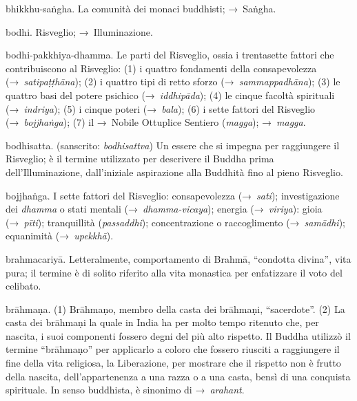 \begin{glossarydescription}
\item[bhikkhu-saṅgha.] La comunità dei monaci buddhisti; →~Saṅgha.

\item[bodhi.] Risveglio; →~Illuminazione.

\item[bodhi-pakkhiya-dhamma.] Le parti del Risveglio, ossia i trentasette
  fattori che contribuiscono al Risveglio: (1) i quattro fondamenti della
  consapevolezza (→~\emph{satipaṭṭhāna}); (2) i quattro tipi di retto sforzo
  (→~\emph{sammappadhāna}); (3) le quattro basi del potere psichico
  (→~\emph{iddhipāda}); (4) le cinque facoltà spirituali (→~\emph{indriya}); (5)
  i cinque poteri (→~\emph{bala}); (6) i sette fattori del Risveglio
  (→~\emph{bojjhaṅga}); (7) il →~Nobile Ottuplice Sentiero (\emph{magga});
  →~\emph{magga}.

\item[bodhisatta.] (sanscrito: \emph{bodhisattva}) Un essere che si impegna per
  raggiungere il Risveglio; è il termine utilizzato per descrivere il Buddha
  prima dell'Illuminazione, dall'iniziale aspirazione alla Buddhità fino al
  pieno Risveglio.

\item[bojjhaṅga.]\label{glossary-bojjhanga} I sette fattori del Risveglio: consapevolezza
  (→~\emph{sati}); investigazione dei \emph{dhamma} o stati mentali
  (→~\emph{dhamma-vicaya}); energia (→~\emph{viriya}): gioia (→~\emph{pīti});
  tranquillità (\emph{passaddhi}); concentrazione o raccoglimento
  (→~\emph{samādhi}); equanimità (→~\emph{upekkhā}).

\item[brahmacariyā.] Letteralmente, comportamento di Brahmā, ``condotta
  divina'', vita pura; il termine è di solito riferito alla vita monastica per
  enfatizzare il voto del celibato.

\item[brāhmaṇa.]\label{glossary-brahmana} (1) Brāhmaṇo, membro della casta dei brāhmaṇi,
  ``sacerdote''. (2) La casta dei brāhmaṇi la quale in India ha per molto tempo
  ritenuto che, per nascita, i suoi componenti fossero degni del più alto
  rispetto. Il Buddha utilizzò il termine ``brāhmaṇo'' per applicarlo a coloro
  che fossero riusciti a raggiungere il fine della vita religiosa, la
  Liberazione, per mostrare che il rispetto non è frutto della nascita,
  dell'appartenenza a una razza o a una casta, bensì di una conquista
  spirituale. In senso buddhista, è sinonimo di →~\emph{arahant}.


\end{glossarydescription}
